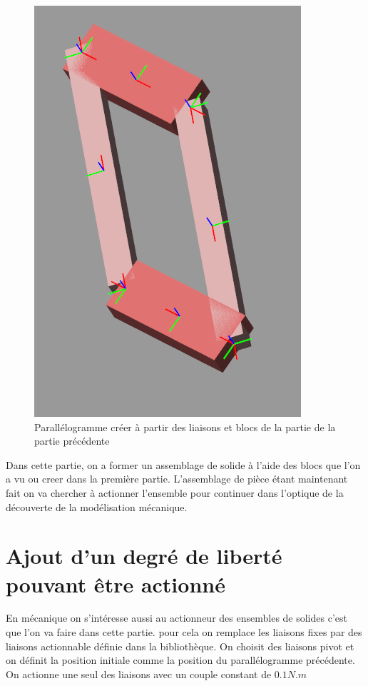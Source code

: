 \documentclass[12pt,a4paper]{article}
\begin{document}
\begin{figure}[h!]
\centering
\includegraphics[scale=0.5]{figure_paralallelo.png}
\caption{Parallélogramme créer à partir des liaisons et blocs de la partie de la partie précédente}
\label{figure_parallélograme}
\end{figure}
 
Dans cette partie, on a former un assemblage de solide à l'aide des blocs que l'on a vu ou creer dans la première partie. L'assemblage de pièce étant maintenant fait on va chercher à actionner l'ensemble pour continuer dans l'optique de la découverte de la modélisation mécanique.

\section{Ajout d'un degré de liberté pouvant être actionné}
En mécanique on s'intéresse aussi au actionneur des ensembles de solides c'est que l'on va faire dans cette partie. pour cela on remplace les liaisons fixes par des liaisons actionnable définie dans la bibliothèque. On choisit des liaisons pivot et on définit la position initiale comme la position du parallélogramme précédente. On actionne une seul des liaisons avec un couple constant de $0.1  N.m$ 
\end{document}
